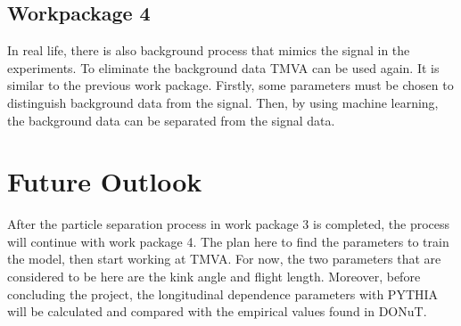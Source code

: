 \documentclass[12pt]{report}
\begin{document}
\subsection{Workpackage 4}
\label{sec:WP4}
In real life, there is also background process that mimics the signal in the experiments. To eliminate the background data TMVA can be used again. It is similar to the previous work package. Firstly, some parameters must be chosen to distinguish background data from the signal. Then, by using machine learning, the background data can be separated from the signal data.

\newpage

\section{Future Outlook}

After the particle separation process in work package 3 is completed, the process will continue with work package 4. The plan here to find the parameters to train the model, then start working at TMVA. For now, the two parameters that are considered to be here are the kink angle and flight length. Moreover, before concluding the project, the longitudinal dependence parameters with PYTHIA will be calculated and compared with the empirical values found in DONuT.

{}

\end{document}
